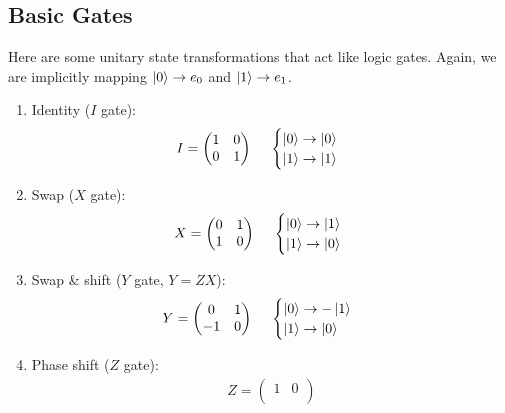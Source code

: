 \documentclass{article}
\begin{document}
\subsection{Basic Gates}
Here are some unitary state transformations that act like logic gates. Again, we are implicitly mapping $\ket{0} \to e_0$ and $\ket{1} \to e_1$.
\begin{enumerate}
    \item Identity ($I$ gate):
    \begin{align}
        I = 
        \begin{pmatrix}
            1 & 0 \\
            0 & 1
        \end{pmatrix}
        \ \ \ \
        &
        \begin{cases}
            \ket{0} \to \ket{0} \\
            \ket{1} \to \ket{1}
        \end{cases}
    \end{align}
    \item Swap ($X$ gate):
    \begin{align}
        X = 
        \begin{pmatrix}
            0 & 1 \\
            1 & 0
        \end{pmatrix}
        \ \ \ \
        &
        \begin{cases}
            \ket{0} \to \ket{1} \\
            \ket{1} \to \ket{0}
        \end{cases}
    \end{align}
    \item Swap \& shift ($Y$ gate, $Y=ZX$):
    \begin{align}
        Y = 
        \begin{pmatrix}
            0 & 1 \\
            -1 & 0
        \end{pmatrix}
        \ \ \ \
        &
        \begin{cases}
            \ket{0} \to -\ket{1} \\
            \ket{1} \to \ket{0}
        \end{cases}
    \end{align}
    \item Phase shift ($Z$ gate):
    \begin{align}
        Z = 
        \begin{pmatrix}
            1 & 0 \\

\end{pmatrix}
\end{align}
\end{enumerate}
\end{document}
